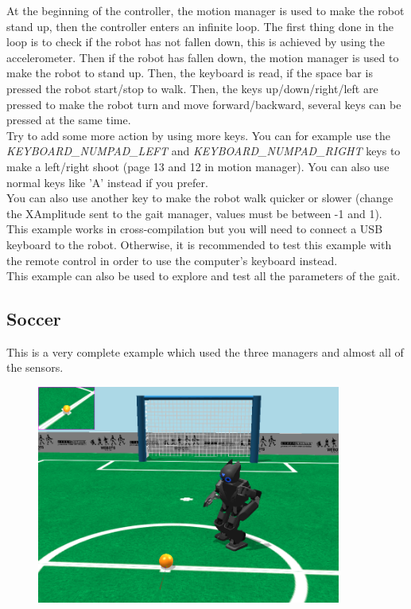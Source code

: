 \documentclass[a4paper, 12pt]{article}  		%
\begin{document}
At the beginning of the controller, the motion manager is used to make the robot stand up, then the controller enters an infinite loop.
The first thing done in the loop is to check if the robot has not fallen down, this is achieved by using the accelerometer. Then if the robot has fallen down, the motion manager is used to make the robot to stand up. 
Then, the keyboard is read, if the space bar is pressed the robot start/stop to walk.
Then, the keys up/down/right/left are pressed to make the robot turn and move forward/backward, several keys can be pressed at the same time.\\

Try to add some more action by using more keys. You can for example use the \textit{KEYBOARD\_NUMPAD\_LEFT} and \textit{KEYBOARD\_NUMPAD\_RIGHT} keys to make a left/right shoot (page 13 and 12 in motion manager). You can also use normal keys like 'A' instead if you prefer.\\

You can also use another key to make the robot walk quicker or slower (change the XAmplitude sent to the gait manager, values must be between -1 and 1).\\

This example works in cross-compilation but you will need to connect a USB keyboard to the robot. Otherwise, it is recommended to test this example with the remote control in order to use the computer's keyboard instead.\\

This example can also be used to explore and test all the parameters of the gait.\\

\newpage
\subsection{Soccer}

This is a very complete example which used the three managers and almost all of the sensors.\\

\begin{figure}[H]
\begin{center}
\includegraphics[width=10cm]{example_sample.png}
\label{example_sample.png}
\end{center}
\end{figure}
\end{document}
